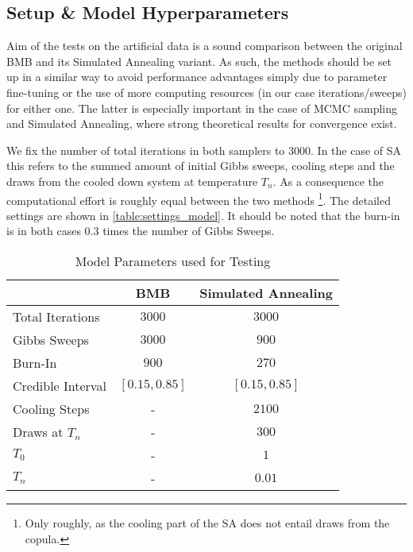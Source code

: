 \subsection{Setup \& Model Hyperparameters}
Aim of the tests on the artificial data is a sound comparison between the original BMB and its Simulated Annealing variant.
As such, the methods should be set up in a similar way to avoid performance advantages simply due to parameter fine-tuning or the use of more computing resources (in our case iterations/sweeps) for either one.
The latter is especially important in the case of MCMC sampling and Simulated Annealing, where strong theoretical results for convergence exist.

We fix the number of total iterations in both samplers to 3000.
In the case of SA this refers to the summed amount of initial Gibbs sweeps, cooling steps and the draws from the cooled down system at temperature $T_n$.
As a consequence the computational effort is roughly equal between the two methods
\footnote{Only roughly, as the cooling part of the SA does not entail draws from the copula.}.
The detailed settings are shown in \autoref{table:settings_model}.
It should be noted that the burn-in is in both cases $0.3$ times the number of Gibbs Sweeps.

\begin{table}[H]
	\centering
	\caption{Model Parameters used for Testing\label{table:settings_model}}
	\begin{tabular}{l c c}
		& \textbf{BMB}   & \textbf{Simulated Annealing} \\
		\toprule
		Total Iterations  & $3000$         & $3000$                       \\\midrule
		Gibbs Sweeps      & $3000$         & $900$                        \\
		Burn-In           & $900$          & $270$                        \\
		Credible Interval & $[0.15, 0.85]$ & $[0.15, 0.85]$               \\
		Cooling Steps     & -              & $2100$                       \\
		Draws at $T_n$    & -              & $300$                        \\
		$T_0$             & -              & $1$                          \\
		$T_n$             & -              & $0.01$                       
	\end{tabular}
\end{table}


